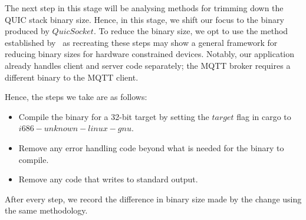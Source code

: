 The next step in this stage will be analysing methods for trimming down the QUIC stack binary size.
Hence, in this stage, we shift our focus to the binary produced by $QuicSocket$.
To reduce the binary size, we opt to use the method established by~\citet{eggert_towards_2020} as recreating these steps may show a general framework for reducing binary sizes for hardware constrained devices.
Notably, our application already handles client and server code separately; the MQTT broker requires a different binary to the MQTT client.

Hence, the steps we take are as follows:

\begin{itemize}
    \item Compile the binary for a 32-bit target by setting the $target$ flag in cargo to $i686-unknown-linux-gnu$.
    \item Remove any error handling code beyond what is needed for the binary to compile.
    \item Remove any code that writes to standard output.
\end{itemize}

After every step, we record the difference in binary size made by the change using the same methodology.
